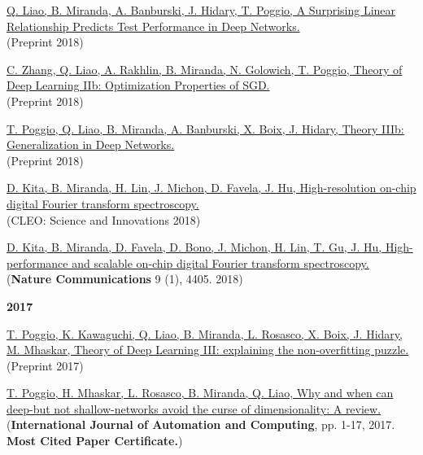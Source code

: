 \documentclass{article}
\newenvironment{changemargin}[2]{%
  \begin{list}{}{%
    \setlength{\topsep}{0pt}%
    \setlength{\leftmargin}{#1}%
    \setlength{\rightmargin}{#2}%
    \setlength{\listparindent}{\parindent}%
    \setlength{\itemindent}{\parindent}%
    \setlength{\parsep}{\parskip}%
  }%
  \item[]}{\end{list}
}
\newenvironment{body} {
	\vspace*{-16pt}
	\begin{changemargin}{-0.25in}{-0.5in}
  }	
	{\end{changemargin}
}
\begin{document}
\begin{body}
    \vspace{10pt}
    \href{https://arxiv.org/abs/1807.09659}
    {Q. Liao, B. Miranda, A. Banburski, J. Hidary, T. Poggio,
    A Surprising Linear Relationship Predicts Test Performance in Deep Networks.}
    \\
    (Preprint 2018)

    \vspace{10pt}
    \href{https://arxiv.org/abs/1801.02254}
    {C. Zhang, Q. Liao, A. Rakhlin, B. Miranda, N. Golowich, T. Poggio,
    Theory of Deep Learning IIb: Optimization Properties of SGD.}
    \\
    (Preprint 2018)

    \vspace{10pt}
    \href{https://arxiv.org/abs/1806.11379}
    {T. Poggio, Q. Liao, B. Miranda, A. Banburski, X. Boix, J. Hidary,
    Theory IIIb: Generalization in Deep Networks.}
    \\
    (Preprint 2018)

    \vspace{10pt}
    \href{https://www.osapublishing.org/abstract.cfm?uri=CLEO_SI-2018-SF1A.1}
    {D. Kita, B. Miranda, H. Lin, J. Michon, D. Favela, J. Hu,
    High-resolution on-chip digital Fourier transform spectroscopy.}
    \\
    (CLEO: Science and Innovations 2018)

    \vspace{10pt}
    \href{https://www.nature.com/articles/s41467-018-06773-2}
    {D. Kita, B. Miranda, D. Favela, D. Bono, J. Michon, H. Lin, T. Gu, J. Hu,
    High-performance and scalable on-chip digital Fourier transform spectroscopy.}
    \\
    (\textbf{Nature Communications} 9 (1), 4405. 2018)

    \vspace{12pt}
    \textbf{\large 2017}
    \vspace{4pt}

    \vspace{10pt}
    \href{https://arxiv.org/abs/1801.00173}
    {T. Poggio, K. Kawaguchi, Q. Liao, B. Miranda, L. Rosasco, X. Boix, J. Hidary, M. Mhaskar,
    Theory of Deep Learning III: explaining the non-overfitting puzzle.}
    \\
    (Preprint 2017)

    \vspace{10pt}
    \href{https://link.springer.com/article/10.1007/s11633-017-1054-2}
    {T. Poggio, H. Mhaskar, L. Rosasco, B. Miranda, Q. Liao,
    Why and when can deep-but not shallow-networks avoid the curse of dimensionality: A review.}
    \\
    (\textbf{International Journal of Automation and Computing}, pp. 1-17, 2017. \textbf{Most Cited Paper Certificate.})

    \vspace{4pt}
\end{body}
\end{document}
